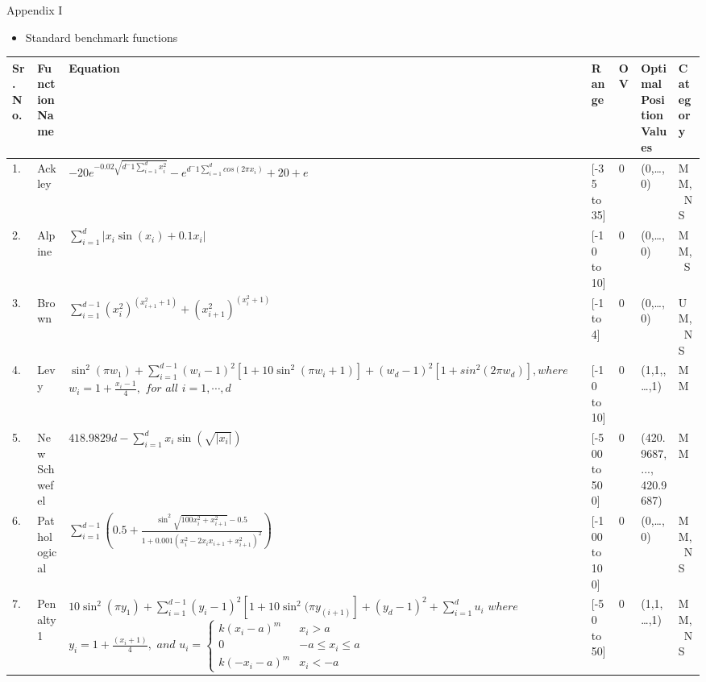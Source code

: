 \documentclass [9pt,times] {beamer}
\begin{document}
\begin{frame}[fragile]{Appendix I}
\begin{itemize}
\item Standard benchmark functions
\end{itemize}
\begin{table}

\fontsize{6pt}{5pt}\selectfont
\renewcommand{\arraystretch}{1}
\vspace{-0.25cm}
  \begin{tabular}{p{0.06in} p{0.32in} p{1.5in} p{0.4in} p{0.08in} p{0.34in} p{0.34in}}
    \hline
\fontsize{6pt}{5pt}\selectfont
\textbf{Sr. No.}  &\textbf{Function Name}	&	 \textbf{Equation}	&			\textbf{Range }	 & \textbf{OV} &\textbf{Optimal Position Values }&\textbf{Category}\\
\hline

1.	&	Ackley	&	$ -20 e^{-0.02\sqrt{d^-1 \sum_{i=1}^d x_i^2}}-e^{d^-1\sum_{i=1}^d cos(2\pi x_i)}+20+e$	&	[-35 to 35]	&	 0	&	 (0,\dots,0) & MM,\ NS\\
2.	&	Alpine	&	$ \sum_{i=1}^{d} |x_i \sin(x_i) + 0.1 x_i|$	&	[-10 to 10] 	&	0	&	 (0,\dots,0)& MM,\ S\\
3.	&	Brown	&	$ \sum_{i=1}^{d-1} (x_i^2)^{(x_{i+1}^2+1)} + (x_{i+1}^2)^{(x_i^2+1)}$ &	 [-1 to 4]	 &	0	&	(0,\dots,0)& UM,\ NS\\
4.	&	Levy	&	$ \sin^2(\pi w_1) + \sum_{i=1}^{d-1} (w_i-1)^2 \left[1 + 10\sin^2(\pi w_i+1)\right] + (w_d-1)^2 \left[1+sin^2(2\pi w_d)\right], where$ $w_i = 1 + \frac{x_i-1}{4} ,$ $for$ $all$ $i = 1,\cdots,d $	&	[-10 to 10] 	&	 0	&	 (1,1,,\dots,1)& MM\\
5.	&	New Schwefel	&	$ 418.9829d - \sum_{i=1}^{d}x_i \sin(\sqrt{|x_i|})$	&	[-500 to 500]	 &	0	&	 (420.9687,..., 420.9687)& MM\\
6.    &	Pathological	&	$ \sum_{i=1}^{d-1}   \left( 0.5 + \frac{\sin^2 \sqrt{ 100x_i^2 + x_{i+1}^2} - 0.5} {1 + 0.001 (x_i^2 - 2x_ix_{i+1} + x_{i+1}^2)^2} \right) $	&	[-100 to 100]	 &	0	&	(0,\dots,0)& MM,\ NS\\
7.	&	Penalty1	&	$ 10\sin^2 (\pi y_1) + \sum_{i=1}^{d-1} (y_i-1)^2 [1 + 10 \sin^2 (\pi y_{(i+1)}] + (y_d-1)^2 + \sum_{i=1}^{d} u_i$ $where$ $y_i = 1 + \frac{(x_i+1)}{4},$ $and$ $u_i = \begin{cases}k(x_i-a)^m & x_i>a\\0 & -a\leq x_i \leq a\\k(-x_i-a)^m & x_i < -a\end{cases} $	&	 [-50 to 50]	&	 0	&	(1,1,\dots,1)	& MM,\ NS\\

\end{tabular}
\end{table}

\end{frame}
\end{document}
